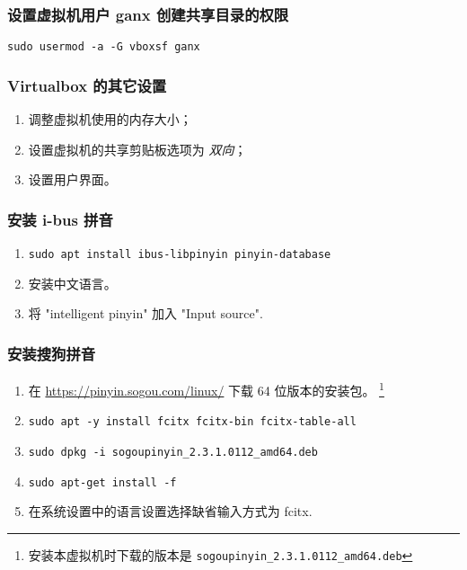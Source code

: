 \documentclass[
    11pt,
    cite=authoryear,
    device=normal,
    lang=cn,
    mode=simple,
    result=answer,
    toc=onecol,
]{elegantbook_sierxue}
\begin{document}
\subsubsection{设置虚拟机用户 ganx 创建共享目录的权限}%
\label{ssub:vbox-ganx-vboxsf}
\lstinline{sudo usermod -a -G vboxsf ganx}

\subsubsection{Virtualbox 的其它设置}%
\label{ssub:vbox-others}
\begin{enumerate}
    \item 调整虚拟机使用的内存大小；
    \item 设置虚拟机的共享剪贴板选项为 \emph{双向}；
    \item 设置用户界面。
\end{enumerate}


\subsubsection{安装 i-bus 拼音}%
\label{ssub:pinyin-i-bus}
\begin{enumerate}
    \item \lstinline{sudo apt install ibus-libpinyin pinyin-database}
    \item 安装中文语言。
    \item 将 "intelligent pinyin" 加入 "Input source".
\end{enumerate}

\subsubsection{安装搜狗拼音}%
\label{ssub:pinyin-sogou}
\begin{enumerate}
    \item 在 \href{https://pinyin.sogou.com/linux/}
        {https://pinyin.sogou.com/linux/} 下载 64 位版本的安装包。
        \footnote{安装本虚拟机时下载的版本是
            \lstinline{sogoupinyin_2.3.1.0112_amd64.deb}
        }
    \item \lstinline{sudo apt -y install fcitx fcitx-bin fcitx-table-all}
    \item \lstinline{sudo dpkg -i sogoupinyin_2.3.1.0112_amd64.deb}
    \item \lstinline{sudo apt-get install -f}
    \item 在系统设置中的语言设置选择缺省输入方式为 fcitx.
\end{enumerate}
\end{document}
